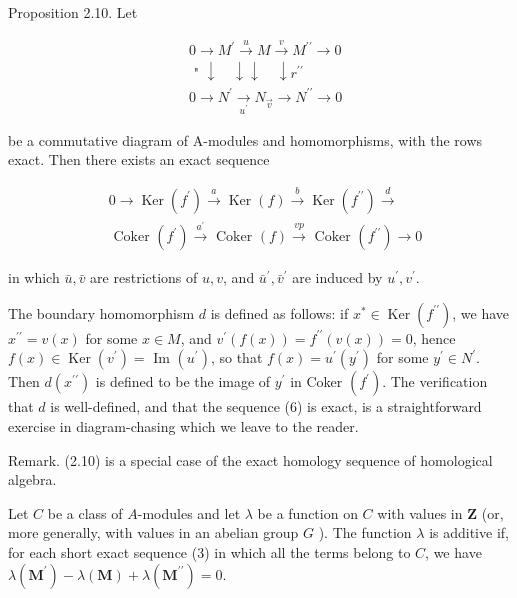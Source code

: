 \documentclass{standalone}
\theoremstyle{definition}
\theoremstyle{remark}
\begin{document}
Proposition 2.10. Let

\[
\begin{aligned}
& 0 \rightarrow M^{\prime} \stackrel{u}{\rightarrow} M \stackrel{v}{\rightarrow} M^{\prime \prime} \rightarrow 0 \\
& \text { " } \downarrow \quad \downarrow \downarrow \quad \downarrow r^{\prime \prime} \\
& 0 \rightarrow N^{\prime} \underset{u^{\prime}}{\rightarrow} N_{\vec{v}} \rightarrow N^{\prime \prime} \rightarrow 0
\end{aligned}
\]

be a commutative diagram of A-modules and homomorphisms, with the rows exact. Then there exists an exact sequence

\[
\begin{aligned}
& 0 \rightarrow \operatorname{Ker}\left(f^{\prime}\right) \stackrel{a}{\rightarrow} \operatorname{Ker}(f) \stackrel{b}{\rightarrow} \operatorname{Ker}\left(f^{\prime \prime}\right) \stackrel{d}{\rightarrow} \\
& \text { Coker }\left(f^{\prime}\right) \stackrel{a^{\prime}}{\rightarrow} \text { Coker }(f) \stackrel{v p}{\rightarrow} \text { Coker }\left(f^{\prime \prime}\right) \rightarrow 0
\end{aligned}
\]

in which $\bar{u}, \bar{v}$ are restrictions of $u, v$, and $\bar{u}^{\prime}, \bar{v}^{\prime}$ are induced by $u^{\prime}, v^{\prime}$.

The boundary homomorphism $d$ is defined as follows: if $x^{*} \in \operatorname{Ker}\left(f^{\prime \prime}\right)$, we have $x^{\prime \prime}=v(x)$ for some $x \in M$, and $v^{\prime}(f(x))=f^{\prime \prime}(v(x))=0$, hence $f(x) \in \operatorname{Ker}\left(v^{\prime}\right)=$ Im $\left(u^{\prime}\right)$, so that $f(x)=u^{\prime}\left(y^{\prime}\right)$ for some $y^{\prime} \in N^{\prime}$. Then $d\left(x^{\prime \prime}\right)$ is defined to be the image of $y^{\prime}$ in Coker $\left(f^{\prime}\right)$. The verification that $d$ is well-defined, and that the sequence (6) is exact, is a straightforward exercise in diagram-chasing which we leave to the reader.

Remark. (2.10) is a special case of the exact homology sequence of homological algebra.

Let $C$ be a class of $A$-modules and let $\lambda$ be a function on $C$ with values in $\mathbf{Z}$ (or, more generally, with values in an abelian group $G$ ). The function $\lambda$ is additive if, for each short exact sequence (3) in which all the terms belong to $C$, we have $\lambda\left(\boldsymbol{M}^{\prime}\right)-\lambda(\boldsymbol{M})+\lambda\left(\boldsymbol{M}^{\prime \prime}\right)=0$.
\end{document}
